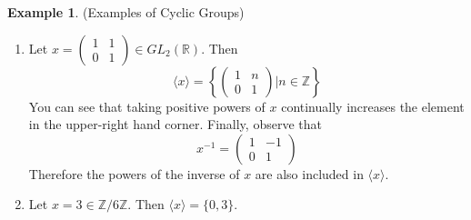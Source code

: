 \documentclass[12pt]{article}
\theoremstyle{definition}
\newtheorem{example}{Example}
\theoremstyle{definition}
\begin{document}
\begin{example}(Examples of Cyclic Groups)
\begin{enumerate}
	\item Let $x = \begin{pmatrix} 1 & 1 \\ 0 & 1 \end{pmatrix} \in GL_2(\mathbb{R})$. Then
	\begin{equation}
		\langle x \rangle = \left\{ \begin{pmatrix} 1 & n \\ 0 & 1 \end{pmatrix} \Big\vert n \in \mathbb{Z} \right\}
	\end{equation}
	You can see that taking positive powers of $x$ continually increases the element in the upper-right hand corner. Finally, observe that 
	\begin{equation}
		x^{-1} = \begin{pmatrix} 1 & -1 \\ 0 & 1 \end{pmatrix}
	\end{equation}
	Therefore the powers of the inverse of $x$ are also included in $\langle x \rangle$.
	\item Let $x = 3 \in \mathbb{Z} / 6 \mathbb{Z}$. Then $\langle x \rangle = \{ 0, 3 \}$.
\end{enumerate}
\end{example}
\end{document}
